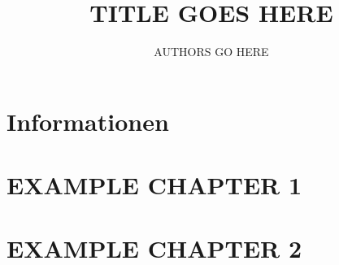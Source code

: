 \documentclass{include/protokollclass}
\title{TITLE GOES HERE}
\author{AUTHORS GO HERE}
\begin{document}
\maketitle
\tableofcontents

\chapter{Informationen}


\chapter{EXAMPLE CHAPTER 1}


\chapter{EXAMPLE CHAPTER 2}

\end{document}

